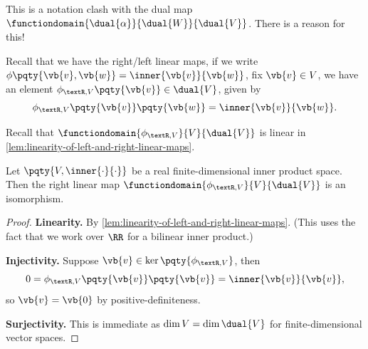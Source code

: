 \begin{remark}
    This is a notation clash with the dual map \(\functiondomain{\dual{\alpha}}{\dual{W}}{\dual{V}}\). There is a reason for this!
\end{remark}

Recall that we have the right/left linear maps, if we write \(\phi\pqty{\vb{v}, \vb{w}} = \inner{\vb{v}}{\vb{w}}\), fix \(\vb{v} \in V\), we have an element \(\phi_{\textR, V} \pqty{\vb{v}} \in \dual{V}\), given by
\[
    \phi_{\textR, V} \pqty{\vb{v}} \pqty{\vb{w}} = \inner{\vb{v}}{\vb{w}}.
\]

Recall that \(\functiondomain{\phi_{\textR, V}}{V}{\dual{V}}\) is linear in \autoref{lem:linearity-of-left-and-right-linear-maps}.

\begin{theorem}
    Let \(\pqty{V, \inner{\cdot}{\cdot}}\) be a real finite-dimensional inner product space. Then the right linear map \(\functiondomain{\phi_{\textR, V}}{V}{\dual{V}}\) is an isomorphism.
\end{theorem}

\begin{proof}
    \textbf{Linearity.} By \autoref{lem:linearity-of-left-and-right-linear-maps}. (This uses the fact that we work over \(\RR\) for a bilinear inner product.)

    \textbf{Injectivity.} Suppose \(\vb{v} \in \ker\pqty{\phi_{\textR, V}}\), then
    \[
        0 = \phi_{\textR, V} \pqty{\vb{v}} \pqty{\vb{v}} = \inner{\vb{v}}{\vb{v}},
    \]
    so \(\vb{v} = \vb{0}\) by positive-definiteness.

    \textbf{Surjectivity.} This is immediate as \(\dim V = \dim \dual{V}\) for finite-dimensional vector spaces.
\end{proof}